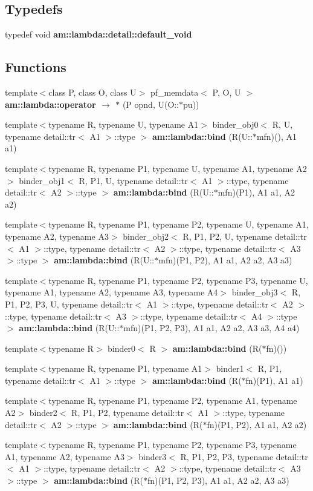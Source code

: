 \subsection*{Typedefs}
\begin{CompactItemize}
\item 
typedef void \textbf{am::lambda::detail::default\_\-void}\label{namespaceam_1_1lambda_1_1detail_3b0afad9dbbb6961d3fe3dbf260ae010}

\end{CompactItemize}
\subsection*{Functions}
\begin{CompactItemize}
\item 
template$<$class P, class O, class U$>$ pf\_\-memdata$<$ P, O, U $>$ {\bf am::lambda::operator $\rightarrow$  $\ast$} (P opnd, U(O::$\ast$pu))
\item 
template$<$typename R, typename U, typename A1$>$ binder\_\-obj0$<$ R, U, typename detail::tr$<$ A1 $>$::type $>$ {\bf am::lambda::bind} (R(U::$\ast$mfn)(), A1 a1)
\item 
template$<$typename R, typename P1, typename U, typename A1, typename A2$>$ binder\_\-obj1$<$ R, P1, U, typename detail::tr$<$ A1 $>$::type, typename detail::tr$<$ A2 $>$::type $>$ {\bf am::lambda::bind} (R(U::$\ast$mfn)(P1), A1 a1, A2 a2)
\item 
template$<$typename R, typename P1, typename P2, typename U, typename A1, typename A2, typename A3$>$ binder\_\-obj2$<$ R, P1, P2, U, typename detail::tr$<$ A1 $>$::type, typename detail::tr$<$ A2 $>$::type, typename detail::tr$<$ A3 $>$::type $>$ {\bf am::lambda::bind} (R(U::$\ast$mfn)(P1, P2), A1 a1, A2 a2, A3 a3)
\item 
template$<$typename R, typename P1, typename P2, typename P3, typename U, typename A1, typename A2, typename A3, typename A4$>$ binder\_\-obj3$<$ R, P1, P2, P3, U, typename detail::tr$<$ A1 $>$::type, typename detail::tr$<$ A2 $>$::type, typename detail::tr$<$ A3 $>$::type, typename detail::tr$<$ A4 $>$::type $>$ {\bf am::lambda::bind} (R(U::$\ast$mfn)(P1, P2, P3), A1 a1, A2 a2, A3 a3, A4 a4)
\item 
template$<$typename R$>$ binder0$<$ R $>$ {\bf am::lambda::bind} (R($\ast$fn)())
\item 
template$<$typename R, typename P1, typename A1$>$ binder1$<$ R, P1, typename detail::tr$<$ A1 $>$::type $>$ {\bf am::lambda::bind} (R($\ast$fn)(P1), A1 a1)
\item 
template$<$typename R, typename P1, typename P2, typename A1, typename A2$>$ binder2$<$ R, P1, P2, typename detail::tr$<$ A1 $>$::type, typename detail::tr$<$ A2 $>$::type $>$ {\bf am::lambda::bind} (R($\ast$fn)(P1, P2), A1 a1, A2 a2)
\item 
template$<$typename R, typename P1, typename P2, typename P3, typename A1, typename A2, typename A3$>$ binder3$<$ R, P1, P2, P3, typename detail::tr$<$ A1 $>$::type, typename detail::tr$<$ A2 $>$::type, typename detail::tr$<$ A3 $>$::type $>$ {\bf am::lambda::bind} (R($\ast$fn)(P1, P2, P3), A1 a1, A2 a2, A3 a3)
\end{CompactItemize}
